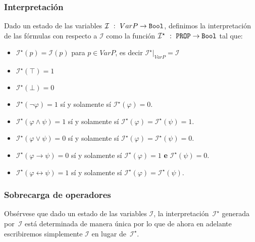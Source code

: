 \documentclass[a4paper]{article}
\begin{document}
\subsubsection{Interpretación}
\noindent
Dado un estado de las variables $\mathcal{I} \ : \ VarP \to \text{\texttt{Bool}}$, 
definimos la interpretación de las fórmulas con respecto a $\mathcal{I}$ como la función
$\mathcal{I}^{\star} \ : \ \text{\texttt{PROP}} \to \text{\texttt{Bool}}$ tal que:
\begin{itemize}
    \item $\mathcal{I}^{\star}(p)=\mathcal{I}(p)$ para $p\in VarP$, es decir
    \(\mathcal{I}^{\star}|_{VarP} = \mathcal{I}\)
    \item $\mathcal{I}^{\star}(\top)=1$
    \item $\mathcal{I}^{\star}(\bot)=0$
    \item $\mathcal{I}^{\star}(\lnot\varphi)=1$ sí y solamente sí $\mathcal{I}^{\star}(\varphi)=0$.
    \item $\mathcal{I}^{\star}(\varphi\land\psi)=1$ sí y solamente sí $\mathcal{I}^{\star}(\varphi)=\mathcal{I}^{\star}(\psi)=1$.
    \item $\mathcal{I}^{\star}(\varphi\lor\psi)=0$ sí y solamente sí $\mathcal{I}^{\star}(\varphi)=\mathcal{I}^{\star}(\psi)=0$.
    \item $\mathcal{I}^{\star}(\varphi \rightarrow \psi)=0$ sí y solamente sí $\mathcal{I}^{\star}(\varphi)=1$ \textbf{e}
      $\mathcal{I}^{\star}(\psi)=0$.
    \item $\mathcal{I}^{\star}(\varphi \leftrightarrow \psi)=1$ sí y solamente sí $\mathcal{I}^{\star}(\varphi)=\mathcal{I}^{\star}(\psi)$. 
\end{itemize}
\subsubsection{Sobrecarga de operadores}
Obsérvese que dado un estado de las variables $\mathcal{I}$, %
la interpretación~$\mathcal{I}^{\star}$ generada por~$\mathcal{I}$ est\'a determinada de manera 
\'unica por lo que de ahora en adelante escribiremos simplemente $\mathcal{I}$ en lugar 
de~$\mathcal{I}^{\star}$.
\end{document}
